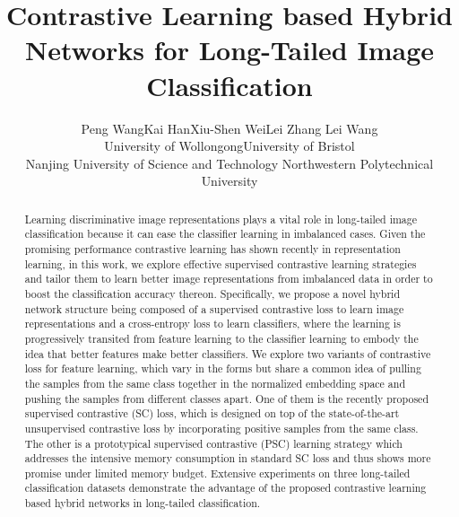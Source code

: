 \documentclass[final]{cvpr}
\begin{document}

\title{Contrastive Learning based Hybrid Networks for Long-Tailed Image Classification}

\author{Peng Wang\quad Kai Han\quad Xiu-Shen Wei\quad Lei Zhang \quad Lei Wang \\
University of Wollongong\quad University of Bristol \\ Nanjing University of Science and Technology \quad
Northwestern Polytechnical University\\}




\maketitle

\begin{abstract}
Learning discriminative image representations plays a vital role in long-tailed image classification because it can ease the classifier learning in imbalanced cases. Given the promising performance contrastive learning has shown recently in representation learning, in this work, we explore effective supervised contrastive learning strategies and tailor them to learn better image representations from imbalanced data in order to boost the classification accuracy thereon. Specifically, we propose a novel hybrid network structure being composed of a supervised contrastive loss to learn image representations and a cross-entropy loss to learn classifiers, where the learning is progressively transited from feature learning to the classifier learning to embody the idea that better features make better classifiers. We explore two variants of contrastive loss for feature learning, which vary in the forms but share a common idea of pulling the samples from the same class together in the normalized embedding space and pushing the samples from different classes apart. One of them is the recently proposed supervised contrastive (SC) loss, which is designed on top of the state-of-the-art unsupervised contrastive loss by incorporating positive samples from the same class. The other is a prototypical supervised contrastive (PSC) learning strategy which addresses the intensive memory consumption in standard SC loss and thus shows more promise under limited memory budget. Extensive experiments on three long-tailed classification datasets demonstrate the advantage of the proposed contrastive learning based hybrid networks in long-tailed classification.
\end{abstract}
\end{document}

